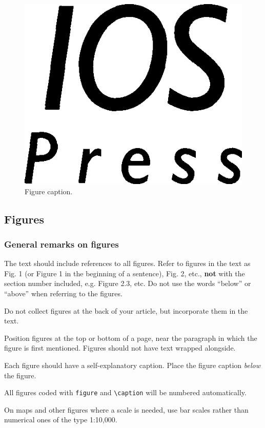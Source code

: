 \documentclass[bsi]{iosart2x}
\begin{document}
\begin{figure}[b]
\includegraphics{iospress}
\caption{Figure caption.}
\end{figure}


\subsection{Figures}
\subsubsection{General remarks on figures}
The text should include references to all figures.
Refer to figures in the text as Fig. 1 (or Figure 1 in the beginning of a sentence), Fig. 2, etc., \textbf{not} with the section number included,
e.g. Figure 2.3, etc. Do not use the words ``below'' or ``above'' when referring to the
figures.

Do not collect figures at the back of your article, but incorporate them in the text.

Position figures at the top or bottom of a page, near the paragraph in which the figure is first mentioned.
Figures should not have text wrapped alongside.

Each figure should have a self-explanatory caption. Place the figure caption \textit{below} the figure.

All figures coded with \verb|figure| and \verb|\caption| will be numbered automatically.

On maps and other figures where a scale is needed, use bar scales rather than numerical ones of the type 1:10,000.
\end{document}
